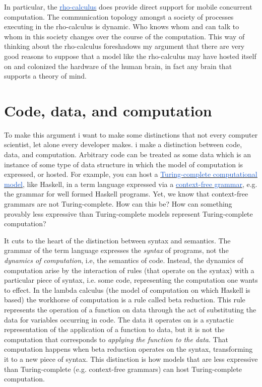 \documentclass[runningheads]{llncs}
\begin{document}
\vspace{1\baselineskip}
In particular, the \href{https://www.sciencedirect.com/science/article/pii/S1571066105051893}{\uline{\textcolor[HTML]{1155CC}{rho-calculus}}} does provide direct support for mobile concurrent computation. The communication topology amongst a society of processes executing in the rho-calculus is dynamic. Who knows whom and can talk to whom in this society changes over the course of the computation. This way of thinking about the rho-calculus foreshadows my argument that there are very good reasons to suppose that a model like the rho-calculus may have hosted itself on and colonized the hardware of the human brain, in fact any brain that supports a theory of mind. 

\vspace{1\baselineskip}
\section{Code, data, and computation}

To make this argument i want to make some distinctions that not every computer scientist, let alone every developer makes. i make a distinction between code, data, and computation. Arbitrary code can be treated as some data which is an instance of some type of data structure in which the model of computation is expressed, or hosted. For example, you can host a \href{https://en.wikipedia.org/wiki/Turing_completeness}{\uline{\textcolor[HTML]{1155CC}{Turing-complete computational model}}}, like Haskell, in a term language expressed via a \href{https://en.wikipedia.org/wiki/Context-free_grammar}{\uline{\textcolor[HTML]{1155CC}{context-free grammar}}}, e.g. the grammar for well formed Haskell programs. Yet, we know that context-free grammars are not Turing-complete. How can this be? How can something provably less expressive than Turing-complete models represent Turing-complete computation?

\vspace{1\baselineskip}
It cuts to the heart of the distinction between syntax and semantics. The grammar of the term language expresses the \textit{syntax} of programs, not the \textit{dynamics of computation}, i.e, the semantics of code. Instead, the dynamics of computation arise by the interaction of rules (that operate on the syntax) with a particular piece of syntax, i.e. some code, representing the computation one wants to effect. In the lambda calculus (the model of computation on which Haskell is based) the workhorse of computation is a rule called beta reduction. This rule represents the operation of a function on data through the act of substituting the data for variables occurring in code. The data it operates on is a syntactic representation of the application of a function to data, but it is not the computation that corresponds to \textit{applying the function to the data}. That computation happens when beta reduction operates on the syntax, transforming it to a new piece of syntax. This distinction is how models that are less expressive than Turing-complete (e.g. context-free grammars) can host Turing-complete computation. 
\end{document}
